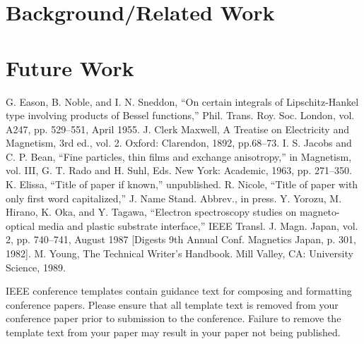 \documentclass[11pt,conference]{IEEEtran}
\begin{document}
\section{Background/Related Work}

\section{Future Work}


\begin{thebibliography}{00}
     G. Eason, B. Noble, and I. N. Sneddon, ``On certain integrals of Lipschitz-Hankel type involving products of Bessel functions,'' Phil. Trans. Roy. Soc. London, vol. A247, pp. 529--551, April 1955.
     J. Clerk Maxwell, A Treatise on Electricity and Magnetism, 3rd ed., vol. 2. Oxford: Clarendon, 1892, pp.68--73.
     I. S. Jacobs and C. P. Bean, ``Fine particles, thin films and exchange anisotropy,'' in Magnetism, vol. III, G. T. Rado and H. Suhl, Eds. New York: Academic, 1963, pp. 271--350.
     K. Elissa, ``Title of paper if known,'' unpublished.
     R. Nicole, ``Title of paper with only first word capitalized,'' J. Name Stand. Abbrev., in press.
     Y. Yorozu, M. Hirano, K. Oka, and Y. Tagawa, ``Electron spectroscopy studies on magneto-optical media and plastic substrate interface,'' IEEE Transl. J. Magn. Japan, vol. 2, pp. 740--741, August 1987 [Digests 9th Annual Conf. Magnetics Japan, p. 301, 1982].
     M. Young, The Technical Writer's Handbook. Mill Valley, CA: University Science, 1989.
\end{thebibliography}
\vspace{12pt}
\color{red}
IEEE conference templates contain guidance text for composing and formatting conference papers. Please ensure that all template text is removed from your conference paper prior to submission to the conference. Failure to remove the template text from your paper may result in your paper not being published.
\end{document}
